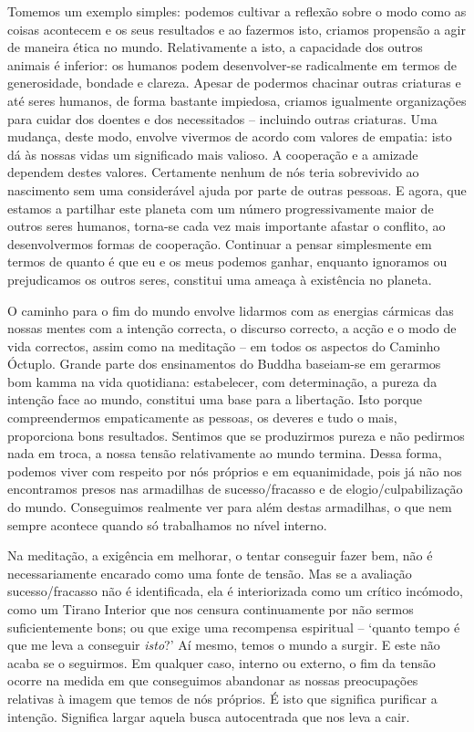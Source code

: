 Tomemos um exemplo simples: podemos cultivar a reflexão sobre o modo como as coisas acontecem e os seus resultados e ao fazermos isto, criamos propensão a agir de maneira ética no mundo. Relativamente a isto, a capacidade dos outros animais é inferior: os humanos podem desenvolver-se radicalmente em termos de generosidade, bondade e clareza. Apesar de podermos chacinar outras criaturas e até seres humanos, de forma bastante impiedosa, criamos igualmente organizações para cuidar dos doentes e dos necessitados -- incluindo outras criaturas. Uma mudança, deste modo, envolve vivermos de acordo com valores de empatia: isto dá às nossas vidas um significado mais valioso. A cooperação e a amizade dependem destes valores. Certamente nenhum de nós teria sobrevivido ao nascimento sem uma considerável ajuda por parte de outras pessoas. E agora, que estamos a partilhar este planeta com um número progressivamente maior de outros seres humanos, torna-se cada vez mais importante afastar o conflito, ao desenvolvermos formas de cooperação. Continuar a pensar simplesmente em termos de quanto é que eu e os meus podemos ganhar, enquanto ignoramos ou prejudicamos os outros seres, constitui uma ameaça à existência no planeta.

O caminho para o fim do mundo envolve lidarmos com as energias cármicas das nossas mentes com a intenção correcta, o discurso correcto, a acção e o modo de vida correctos, assim como na meditação -- em todos os aspectos do Caminho Óctuplo. Grande parte dos ensinamentos do Buddha baseiam-se em gerarmos bom kamma na vida quotidiana: estabelecer, com determinação, a pureza da intenção face ao mundo, constitui uma base para a libertação. Isto porque compreendermos empaticamente as pessoas, os deveres e tudo o mais, proporciona bons resultados. Sentimos que se produzirmos pureza e não pedirmos nada em troca, a nossa tensão relativamente ao mundo termina. Dessa forma, podemos viver com respeito por nós próprios e em equanimidade, pois já não nos encontramos presos nas armadilhas de sucesso/fracasso e de elogio/culpabilização do mundo. Conseguimos realmente ver para além destas armadilhas, o que nem sempre acontece quando só trabalhamos no nível interno.

Na meditação, a exigência em melhorar, o tentar conseguir fazer bem, não é necessariamente encarado como uma fonte de tensão. Mas se a avaliação sucesso/fracasso não é identificada, ela é interiorizada como um crítico incómodo, como um Tirano Interior que nos censura continuamente por não sermos suficientemente bons; ou que exige uma recompensa espiritual -- `quanto tempo é que me leva a conseguir \emph{isto}?' Aí mesmo, temos o mundo a surgir. E este não acaba se o seguirmos. Em qualquer caso, interno ou externo, o fim da tensão ocorre na medida em que conseguimos abandonar as nossas preocupações relativas à imagem que temos de nós próprios. É isto que significa purificar a intenção. Significa largar aquela busca autocentrada que nos leva a cair.


